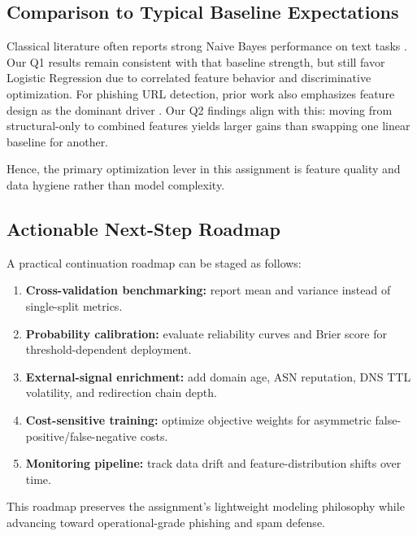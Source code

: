 \subsection{Comparison to Typical Baseline Expectations}

Classical literature often reports strong Naive Bayes performance on text tasks \cite{mccallum1998comparison}. Our Q1 results remain consistent with that baseline strength, but still favor Logistic Regression due to correlated feature behavior and discriminative optimization. For phishing URL detection, prior work also emphasizes feature design as the dominant driver \cite{ma2011learning,aburrous2010intelligent}. Our Q2 findings align with this: moving from structural-only to combined features yields larger gains than swapping one linear baseline for another.

Hence, the primary optimization lever in this assignment is feature quality and data hygiene rather than model complexity.

\subsection{Actionable Next-Step Roadmap}

A practical continuation roadmap can be staged as follows:
\begin{enumerate}
    \item \textbf{Cross-validation benchmarking:} report mean and variance instead of single-split metrics.
    \item \textbf{Probability calibration:} evaluate reliability curves and Brier score for threshold-dependent deployment.
    \item \textbf{External-signal enrichment:} add domain age, ASN reputation, DNS TTL volatility, and redirection chain depth.
    \item \textbf{Cost-sensitive training:} optimize objective weights for asymmetric false-positive/false-negative costs.
    \item \textbf{Monitoring pipeline:} track data drift and feature-distribution shifts over time.
\end{enumerate}

This roadmap preserves the assignment's lightweight modeling philosophy while advancing toward operational-grade phishing and spam defense.
